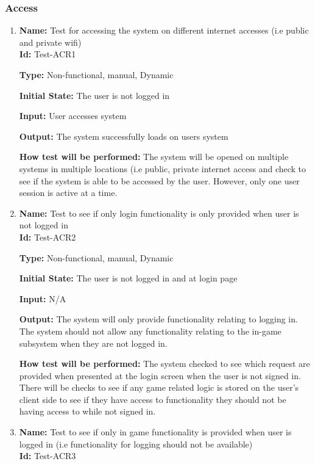 \documentclass[12pt, titlepage]{article}
\begin{document}
\subsubsection{Access}
\begin{enumerate}
    \item{\textbf{Name:} Test for accessing the system on different internet accesses (i.e public and private wifi)\\} \label{Test-ACR1}
    \textbf{Id:} Test-ACR1
    
    \textbf{Type:} Non-functional, manual, Dynamic
    					
    \textbf{Initial State:} The user is not logged in
    					
    \textbf{Input:} User accesses system
    					
    \textbf{Output:} The system successfully loads on users system
    					
    \textbf{How test will be performed:} The system will be opened on multiple systems in multiple locations (i.e public, private internet access and check to see if the system is able to be accessed by the user. However, only one user session is active at a time.
    
    \item{\textbf{Name:} Test to see if only login functionality is only provided when user is not logged in\\} \label{Test-ACR2}
    \textbf{Id:} Test-ACR2
    
    \textbf{Type:} Non-functional, manual, Dynamic
    					
    \textbf{Initial State:} The user is not logged in and at login page
    					
    \textbf{Input:} N/A
    					
    \textbf{Output:} The system will only provide functionality relating to logging in. The system should not allow any functionality relating to the in-game subsystem when they are not logged in.
    					
    \textbf{How test will be performed:} The system checked to see which request are provided when presented at the login screen when the user is not signed in. There will be checks to see if any game related logic is stored on the user's client side to see if they have access to functionality they should not be having access to while not signed in. 
    
    \item{\textbf{Name:} Test to see if only in game functionality is provided when user is logged in (i.e functionality for logging should not be available)\\} \label{Test-ACR3}
    \textbf{Id: }Test-ACR3
    

\end{enumerate}
\end{document}
